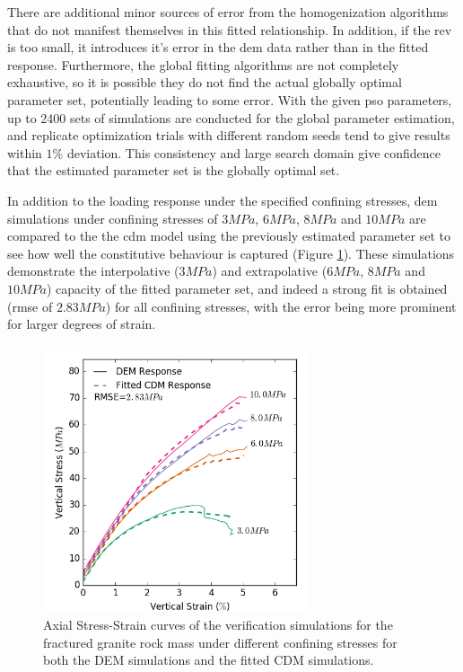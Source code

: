 There are additional minor sources of error from the homogenization algorithms that do not manifest themselves in this fitted relationship.  In addition, if the \acrshort{rev} is too small, it introduces it's error in the \acrshort{dem} data rather than in the fitted response. Furthermore, the global fitting algorithms are not completely exhaustive, so it is possible they do not find the actual globally optimal parameter set, potentially leading to some error. With the given \acrshort{pso} parameters, up to 2400 sets of simulations are conducted for the global parameter estimation, and replicate optimization trials with different random seeds tend to give results within $1\%$ deviation. This consistency and large search domain give confidence that the estimated parameter set is the globally optimal set. 

In addition to the loading response under the specified confining stresses, \acrshort{dem} simulations under confining stresses of $3MPa$, $6MPa$, $8MPa$ and $10MPa$ are compared to the the \acrshort{cdm} model using the previously estimated parameter set to see how well the constitutive behaviour is captured (Figure \ref{fig:fitted2}). These simulations demonstrate the interpolative ($3MPa$) and extrapolative ($6MPa$, $8MPa$ and $10MPa$) capacity of the fitted parameter set, and indeed a strong fit is obtained (\acrshort{rmse} of $2.83MPa$) for all confining stresses, with the error being more prominent for larger degrees of strain.

\begin{figure}[!htb]
\begin{center}
\includegraphics[width=0.7\textwidth]{figures/Chapter5/DruckerVerificationCurves}
\caption{{\label{fig:fitted2} Axial Stress-Strain curves of the verification simulations for the fractured granite rock mass under different confining stresses for both the DEM simulations and the fitted CDM simulations.%
}}
\end{center}
\end{figure}

